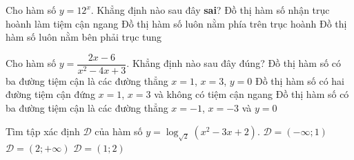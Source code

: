 \begin{ex}%
Cho hàm số $y=12^x$. Khẳng định nào sau đây \textbf{sai}?
{Đồ thị hàm số nhận trục hoành làm tiệm cận ngang}
{Đồ thị hàm số luôn nằm phía trên trục hoành}
{\True Đồ thị hàm số luôn nằm bên phải trục tung}
\end{ex}

\begin{ex}%
Cho hàm số $y=\dfrac{2x-6}{x^2-4x+3}$. Khẳng định nào sau đây đúng?
{Đồ thị hàm số có ba đường tiệm cận là các đường thẳng $x=1$, $x=3$, $y=0$}
{Đồ thị hàm số có hai đường tiệm cận đứng $x=1$, $x=3$ và không có tiệm cận ngang}
{Đồ thị hàm số có ba đường tiệm cận là các đường thẳng $x=-1$, $x=-3$ và $y=0$}
\end{ex}

\begin{ex}%
{}
\end{ex}

\begin{ex}%
Tìm tập xác định $\mathscr{D}$ của hàm số $y=\log_{\sqrt{2}}(x^2-3x+2)$.
{$\mathscr{D}=(-\infty;1)$}
{$\mathscr{D}=(2;+\infty)$}
{$\mathscr{D}=(1;2)$}
\end{ex}

